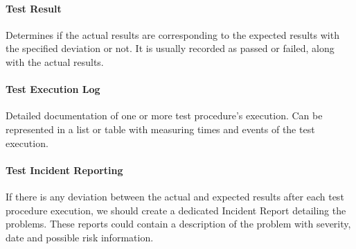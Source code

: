 \paragraph{Test Result}
Determines if the actual results are corresponding to the expected results with the specified deviation or not. It is usually recorded as passed or failed, along with the actual results.

\paragraph{Test Execution Log}
Detailed documentation of one or more test procedure's execution. Can be represented in a list or table with measuring times and events of the test execution.

\paragraph{Test Incident Reporting}
If there is any deviation between the actual and expected results after each test procedure execution, we should create a dedicated Incident Report detailing the problems. These reports could contain a description of the problem with severity, date and possible risk information.
